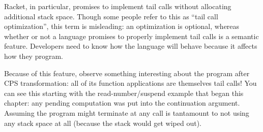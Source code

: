Racket, in particular, promises to implement tail calls without allocating
additional stack space. Though some people refer to this as “tail call
optimization”, this term is misleading: an optimization is optional, whereas
whether or not a language promises to properly implement tail calls is a
semantic feature. Developers need to know how the language will behave because
it affects how they program.

Because of this feature, observe something interesting about the program after
CPS transformation: all of its function applications are themselves tail calls!
You can see this starting with the read-number/suspend example that began this
chapter: any pending computation was put into the continuation argument.
Assuming the program might terminate at any call is tantamount to not using any
stack space at all (because the stack would get wiped out).

